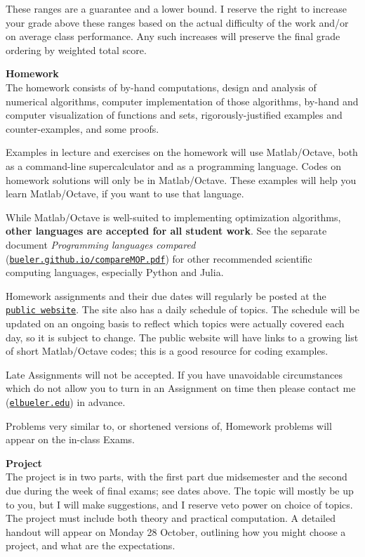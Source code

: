 \documentclass[12pt]{article}
\renewcommand{\emph}[1]{\textsf{\textbf{#1}}}
\newcommand{\localhead}[1]{\par\smallskip\textbf{#1} \smallskip\nobreak\\}%
\def\heading#1{\localhead{\large\emph{#1}}}
\begin{document}
These ranges are a guarantee and a lower bound.  I reserve the right to increase your grade above these ranges based on the actual difficulty of the work and/or on average class performance.  Any such increases will preserve the final grade ordering by weighted total score.


\heading{Homework}
The homework consists of by-hand computations, design and analysis of numerical algorithms, computer implementation of those algorithms, by-hand and computer visualization of functions and sets, rigorously-justified examples and counter-examples, and some proofs.

Examples in lecture and exercises on the homework will use Matlab/Octave, both as a command-line supercalculator and as a programming language.  Codes on homework solutions will only be in Matlab/Octave.  These examples will help you learn Matlab/Octave, if you want to use that language.

While Matlab/Octave is well-suited to implementing optimization algorithms, \emph{other languages are accepted for all student work}.  See the separate document \textsl{Programming languages compared} (\href{https://bueler.github.io/compareMOP.pdf}{\texttt{bueler.github.io/compareMOP.pdf}}) for other recommended scientific computing languages, especially Python and Julia.

Homework assignments and their due dates will regularly be posted at the \href{https://bueler.github.io/opt/}{\texttt{public website}}.  The site also has a daily schedule of topics.  The schedule will be updated on an ongoing basis to reflect which topics were actually covered each day, so it is subject to change.  The public website will have links to a growing list of short Matlab/Octave codes; this is a good resource for coding examples.

Late Assignments will not be accepted.  If you have unavoidable circumstances which do not allow you to turn in an Assignment on time then please contact me (\href{mailto:elbueler@alaska.edu}{\texttt{elbueler\@@alaska.edu}}) in advance.

Problems very similar to, or shortened versions of, Homework problems will appear on the in-class Exams.

\heading{Project}
The project is in two parts, with the first part due midsemester and the second due during the week of final exams; see dates above.  The topic will mostly be up to you, but I will make suggestions, and I reserve veto power on choice of topics.  The project must include both theory and practical computation.  A detailed handout will appear on Monday 28 October, outlining how you might choose a project, and what are the expectations.
\end{document}
